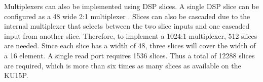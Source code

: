 
Multiplexers can also be implemented using DSP slices. A single DSP slice can be configured as a \SI{48}{\bit} wide 2:1 multiplexer \cite{xilinx-ug579}. Slices can also be cascaded due to the internal multiplexer that selects between the two slice inputs and one cascaded input from another slice. Therefore, to implement a 1024:1 multiplexer, 512 slices are needed. Since each slice has a width of \SI{48}{\bit}, three slices will cover the width of a \SI{16}{\byte} element. A single read port requires 1536 slices. Thus a total of 12288 slices are required, which is more than six times as many slices as available on the KU15P.





